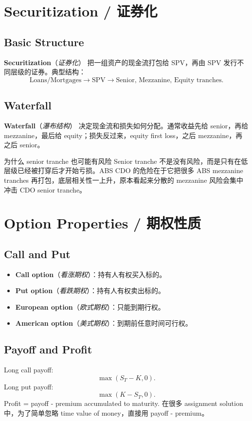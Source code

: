\documentclass[11pt,a4paper,openany]{ctexbook}
\newcommand{\term}[2]{\textbf{#1}（\emph{#2}）}
\newcommand{\source}[1]{\par\smallskip\noindent{\small\textcolor{muted}{Source: #1}}\par}
\begin{document}
\chapter{Securitization / 证券化}
\source{Lecture 9; Assignment 3}

\section{Basic Structure}
\term{Securitization}{证券化} 把一组资产的现金流打包给 SPV，再由 SPV 发行不同层级的证券。典型结构：
\[
\text{Loans/Mortgages}\rightarrow \text{SPV}\rightarrow \text{Senior, Mezzanine, Equity tranches}.
\]

\section{Waterfall}
\term{Waterfall}{瀑布结构} 决定现金流和损失如何分配。通常收益先给 senior，再给 mezzanine，最后给 equity；损失反过来，equity first loss，之后 mezzanine，再之后 senior。

\begin{intuitionbox}{为什么 senior tranche 也可能有风险}
Senior tranche 不是没有风险，而是只有在低层级已经被打穿后才开始亏损。ABS CDO 的危险在于它把很多 ABS mezzanine tranches 再打包，底层相关性一上升，原本看起来分散的 mezzanine 风险会集中冲击 CDO senior tranche。
\end{intuitionbox}

\chapter{Option Properties / 期权性质}
\source{Lecture 10; Assignment 1; Assignment 3}

\section{Call and Put}
\begin{itemize}
  \item \term{Call option}{看涨期权}：持有人有权买入标的。
  \item \term{Put option}{看跌期权}：持有人有权卖出标的。
  \item \term{European option}{欧式期权}：只能到期行权。
  \item \term{American option}{美式期权}：到期前任意时间可行权。
\end{itemize}

\section{Payoff and Profit}
Long call payoff:
\[
\max(S_T-K,0).
\]
Long put payoff:
\[
\max(K-S_T,0).
\]
Profit = payoff - premium accumulated to maturity. 在很多 assignment solution 中，为了简单忽略 time value of money，直接用 payoff - premium。
\end{document}
